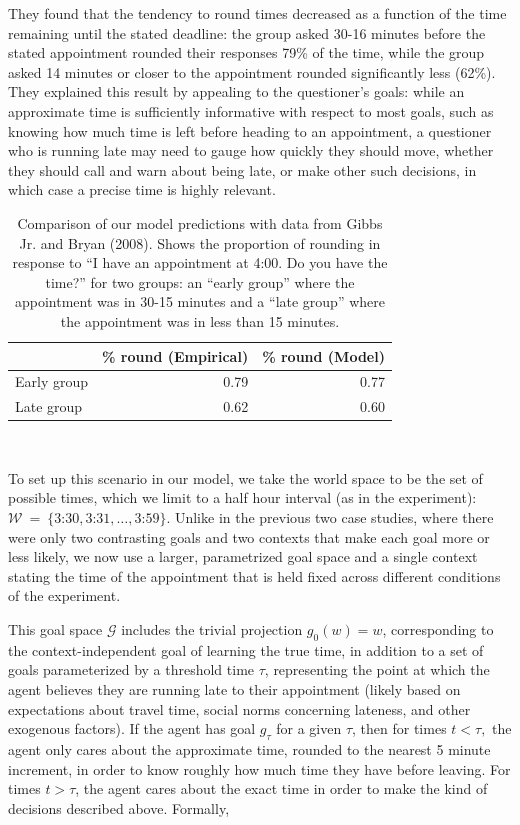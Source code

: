 \documentclass[12pt, floatsintext, jou]{apa6}
\begin{document}
They found that the tendency to round times decreased as a function of the time remaining until the stated deadline: the group asked 30-16 minutes before the stated appointment rounded their responses 79\% of the time, while the group asked 14 minutes or closer to the appointment rounded significantly less (62\%). They explained this result by appealing to the questioner's goals: while an approximate time is sufficiently informative with respect to most goals, such as knowing how much time is left before heading to an appointment, a questioner who is running late may need to gauge how quickly they should move, whether they should call and warn about being late, or make other such decisions, in which case a precise time is highly relevant. 
\begin{table}[t]
\centering
\begin{tabular}{ p{2cm} | r |||||| r }
&  \% round (Empirical) &  \% round (Model) \\
\hline
Early group &  0.79 & 0.77 \\
\hline
Late group     &0.62  & 0.60 \\
\end{tabular}
\\[1.5pt]
\caption{Comparison of our model predictions with data from Gibbs Jr. and Bryan (2008). Shows the proportion of rounding in response to ``I have an appointment at 4:00. Do you have the time?'' for two groups: an ``early group'' where the appointment was in 30-15 minutes and a ``late group'' where the appointment was in less than 15 minutes.} 
\label{table:gibbsJrExp3}
\end{table}
To set up this scenario in our model, we take the world space to be the set of possible times, which we limit to a half hour interval (as in the experiment): $\mathcal{W}~=~\{\textrm{3:30}, \textrm{3:31}, \dots, \textrm{3:59}\}$. Unlike in the previous two case studies, where there were only two contrasting goals and two contexts that make each goal more or less likely, we now use a larger, parametrized goal space and a single context stating the time of the appointment that is held fixed across different conditions of the experiment. 

This goal space $\mathcal{G}$ includes the trivial projection $g_0(w) = w$, corresponding to the context-independent goal of learning the true time, in addition to a set of goals parameterized by a threshold time $\tau$, representing the point at which the agent believes they are running late to their appointment (likely based on expectations about travel time, social norms concerning lateness, and other exogenous factors). If the agent has goal $g_\tau$ for a given $\tau$, then for times $t < \tau,$ the agent only cares about the approximate time, rounded to the nearest 5 minute increment, in order to know roughly how much time they have before leaving. For times $t > \tau$, the agent cares about the exact time in order to make the kind of decisions described above. Formally,
\end{document}
